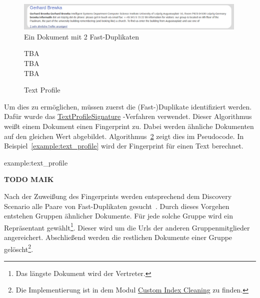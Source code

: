\begin{figure}[!ht]
	\includegraphics[width=0.99\textwidth]{chapter_data_aqcuisition/grouped_duplicates.png}
	\caption{Ein Dokument mit 2 Fast-Duplikaten}
	\label{fig:grouped_sim}
\end{figure}

\begin{figure}
	\vspace*{-0.4cm}

\begin{scriptsize}
\begin{algorithm}[H]
		       

	TBA\\
	TBA\\
	TBA\\
	\caption{Text Profile}
	\label{alg:text_profile}
\end{algorithm}
\end{scriptsize}

	\vspace*{-0.2cm}
\end{figure}

Um dies zu ermöglichen, müssen zuerst die (Fast-)Duplikate identifiziert werden.
Dafür wurde das
\href{https://github.com/apache/nutch/blob/master/src/java/org/apache/nutch/crawl/TextProfileSignature.java}{TextProfileSignature}
-Verfahren verwendet.
Dieser Algorithmus weißt einem Dokument einen Fingerprint zu.
Dabei werden ähnliche Dokumenten auf den gleichen Wert abgebildet.
Algorithmus~\ref{alg:text_profile} zeigt dies im Pseudocode.
In Beispiel~\ref{example:text_profile} wird der Fingerprint für einen Text berechnet.

\begin{example}{example:text_profile}

	\textbf{TODO MAIK}

\end{example}

Nach der Zuweißung des Fingerprints werden entsprechend dem Discovery Scenario alle Paare von Fast-Duplikaten
gesucht~\cite{croft.chap3}. Durch dieses Vorgehen entstehen Gruppen ähnlicher Dokumente.
Für jede solche Gruppe wird ein Repräsentant gewählt\footnote{Das längste Dokument wird der Vertreter.}.
Dieser wird um die Urls der anderen Gruppenmitglieder angereichert.
Abschließend werden die restlichen Dokumente einer Gruppe gelöscht\footnote{Die Implementierung ist in dem Modul 
\href{https://github.com/mam10eks/search-homepage-of-university-leipzig/tree/master/custom-index-cleaning}
{Custom Index Cleaning} zu finden.}.
